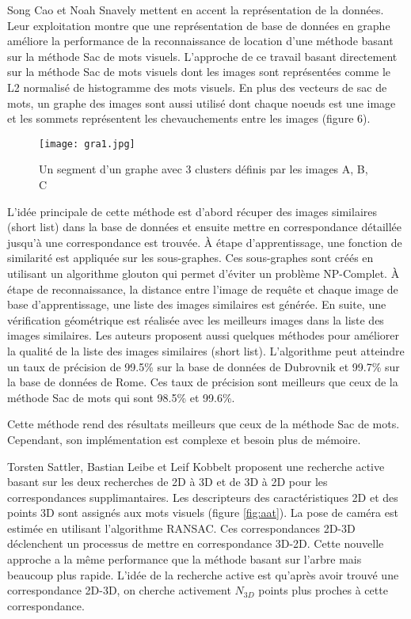 \documentclass[journal]{IEEEtran}
\begin{document}
Song Cao et Noah Snavely \cite{cao2013graph} mettent en accent la représentation de la
données. Leur exploitation montre que une représentation de base de données en graphe 
améliore la performance de la reconnaissance de location d'une méthode basant sur la 
méthode Sac de mots visuels. L'approche de ce travail basant directement sur la méthode 
Sac de mots visuels dont les images sont représentées comme le L2 normalisé de 
histogramme 
des mots visuels. En plus des vecteurs de sac de mots, un graphe des images sont aussi 
utilisé dont chaque noeuds est une image et les sommets représentent les chevauchements 
entre les images (figure 6).  
\begin{figure}[t]
    \centering
	  \texttt{[image: gra1.jpg]}
    \label{fig:grp}
    \caption{Un segment d'un graphe avec 3 clusters définis par les images A, B, C} 
\end{figure}

L'idée principale de cette méthode est d'abord récuper des images similaires (short 
list) dans la base de données et ensuite mettre en correspondance détaillée jusqu'à une 
correspondance est trouvée. À étape d'apprentissage, une fonction de similarité est 
appliquée sur les sous-graphes. Ces sous-graphes sont créés en utilisant un algorithme 
glouton qui permet d'éviter un problème NP-Complet. À étape de reconnaissance, la 
distance entre l'image de requête et chaque image de base d'apprentissage, une liste des 
images similaires est générée. En suite, une vérification géométrique est réalisée avec 
les meilleurs images dans la liste des images similaires. Les auteurs proposent aussi 
quelques méthodes pour améliorer la qualité de la liste des images similaires (short 
list). 
L'algorithme peut atteindre un taux de précision de 99.5\% sur la base de données de 
Dubrovnik et 99.7\% sur la base de données de Rome. Ces taux de précision sont meilleurs 
que ceux de la méthode Sac de mots qui sont 98.5\% et 99.6\%.

Cette méthode rend des résultats meilleurs que ceux de la méthode Sac de mots. Cependant, 
son implémentation est complexe et besoin plus de mémoire.

Torsten Sattler, Bastian Leibe et Leif Kobbelt \cite{sattler2012improving} proposent une 
recherche active basant sur les deux recherches de 2D à 3D et de 3D à 2D pour les 
correspondances supplimantaires. Les descripteurs des caractéristiques 2D et des points 
3D sont assignés aux mots visuels (figure \ref{fig:aat}). La pose de caméra est estimée 
en 
utilisant l'algorithme RANSAC. Ces correspondances 2D-3D déclenchent un processus de 
mettre en correspondance 
3D-2D. Cette nouvelle approche a la même performance que la méthode basant sur 
l'arbre mais beaucoup plus rapide. L'idée de la recherche active est qu'après avoir 
trouvé une correspondance 2D-3D, on cherche activement $N_{3D}$ points plus proches 
à cette correspondance. %
\end{document}
